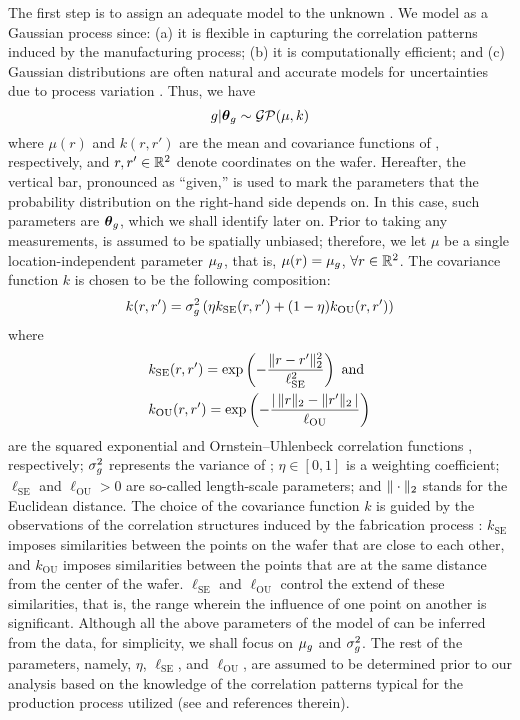 The first step is to assign an adequate model to the unknown \g. We model \g as
a Gaussian process \cite{rasmussen2006} since: (a) it is flexible in capturing
the correlation patterns induced by the manufacturing process; (b) it is
computationally efficient; and (c) Gaussian distributions are often natural and
accurate models for uncertainties due to process variation \cite{srivastava2010,
reda2009, juan2012}. Thus, we have
\begin{equation} \elab{u-prior}
  \g | \vt_\g \sim \mathcal{GP}(\mu, k)
\end{equation}
where $\mu(r)$ and $k(r, r')$ are the mean and covariance functions of \g,
respectively, and $r, r' \in \real^2$ denote coordinates on the wafer.
Hereafter, the vertical bar, pronounced as ``given,'' is used to mark the
parameters that the probability distribution on the right-hand side depends on.
In this case, such parameters are $\vt_\g$, which we shall identify later on.
Prior to taking any measurements, \g is assumed to be spatially unbiased;
therefore, we let $\mu$ be a single location-independent parameter $\mu_\g$,
that is, $\mu(r) = \mu_\g$, $\forall r \in \real^2$. The covariance function $k$
is chosen to be the following composition:
\begin{equation} \elab{covariance-function}
  k(r, r') = \sigma_\g^2 \left(\eta k_\text{SE}(r, r') + (1 - \eta) k_\text{OU}(r, r')\right)
\end{equation}
where
\begin{align*}
  & k_\text{SE}(r, r') = \exp\left(-\frac{\norm[2]{r - r'}^2}{\ell_\text{SE}^2}\right) \text{ and} \\
  & k_\text{OU}(r, r') = \exp\left(-\frac{\absolute{\,\norm[2]{r} - \norm[2]{r'}\,}}{\ell_\text{OU}}\right)
\end{align*}
are the squared exponential and Ornstein--Uhlenbeck correlation functions
\cite{rasmussen2006}, respectively; $\sigma_\g^2$ represents the variance of \g;
$\eta \in [0, 1]$ is a weighting coefficient; $\ell_\text{SE}$ and
$\ell_\text{OU} > 0$ are so-called length-scale parameters; and
$\norm[2]{\cdot}$ stands for the Euclidean distance. The choice of the
covariance function $k$ is guided by the observations of the correlation
structures induced by the fabrication process \cite{chandrakasan2001,
cheng2011}: $k_\text{SE}$ imposes similarities between the points on the wafer
that are close to each other, and $k_\text{OU}$ imposes similarities between the
points that are at the same distance from the center of the wafer.
$\ell_\text{SE}$ and $\ell_\text{OU}$ control the extend of these similarities,
that is, the range wherein the influence of one point on another is significant.
Although all the above parameters of the model of \g can be inferred from the
data, for simplicity, we shall focus on $\mu_\g$ and $\sigma_\g^2$. The rest of
the parameters, namely, $\eta$, $\ell_\text{SE}$, and $\ell_\text{OU}$, are
assumed to be determined prior to our analysis based on the knowledge of the
correlation patterns typical for the production process utilized (see
\cite{marzouk2009} and references therein).

